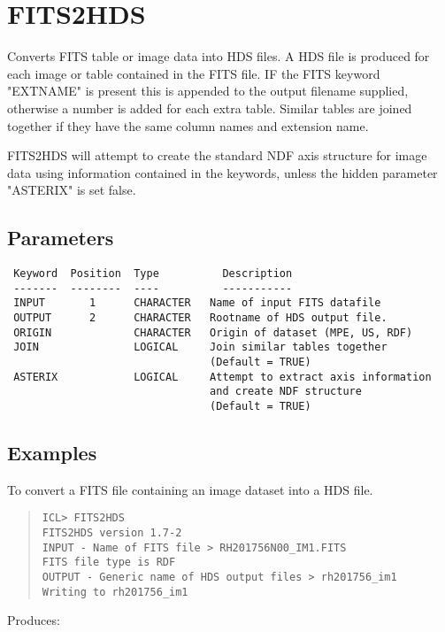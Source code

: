 \documentclass{book}
\renewcommand{\_}{{\tt\char'137}}     %
\begin{document}
\section{FITS2HDS}
Converts FITS table or image data into HDS files.
A HDS file is produced for each image or table contained in the
FITS file. IF the FITS keyword "EXTNAME" is present this is
appended to the output filename supplied, otherwise a number is
added for each extra table. Similar tables are joined together
if they have the same column names and extension name.

FITS2HDS will attempt to create the standard NDF axis structure
for image data using information contained in the keywords, unless
the hidden parameter "ASTERIX" is set false.

\subsection{Parameters}
\begin{verbatim}
 Keyword  Position  Type          Description
 -------  --------  ----          -----------
 INPUT       1      CHARACTER   Name of input FITS datafile
 OUTPUT      2      CHARACTER   Rootname of HDS output file.
 ORIGIN             CHARACTER   Origin of dataset (MPE, US, RDF)
 JOIN               LOGICAL     Join similar tables together
                                (Default = TRUE)
 ASTERIX            LOGICAL     Attempt to extract axis information
                                and create NDF structure
                                (Default = TRUE)

\end{verbatim}\subsection{Examples}
To convert a FITS file containing an image dataset into a HDS file.
\begin{quote}\begin{verbatim}
ICL> FITS2HDS
FITS2HDS version 1.7-2
INPUT - Name of FITS file > RH201756N00_IM1.FITS
FITS file type is RDF
OUTPUT - Generic name of HDS output files > rh201756_im1
Writing to rh201756_im1
\end{verbatim}\end{quote}
Produces:
\end{document}
